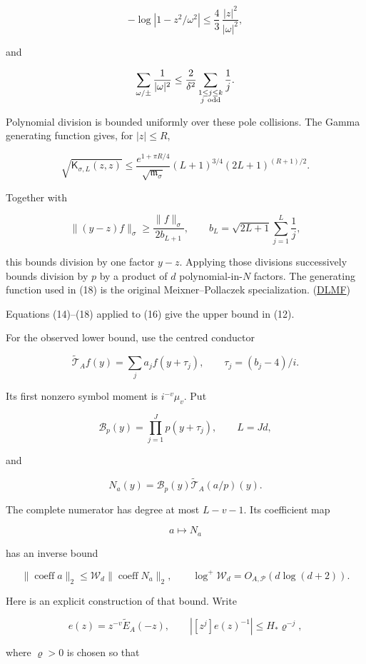 \documentclass[11pt]{article}
\begin{document}
\[
-\log|1-z^2/\omega^2|
\le\frac43\,\frac{|z|^2}{|\omega|^2},
\]

and

\[
\sum_{\omega/\pm}\frac1{|\omega|^2}
\le\frac2{\delta^2}
\sum_{\substack{1\le j\le k\\j\ {\rm odd}}}\frac1j.
\]

Polynomial division is bounded uniformly over these pole collisions. The Gamma generating function gives, for \(|z|\le R\),

\[
\sqrt{\mathsf K_{\sigma,L}(z,z)}
\le
\frac{e^{1+\pi R/4}}{\sqrt{\mathfrak m_\sigma}}
(L+1)^{3/4}(2L+1)^{(R+1)/2}.
\tag{18}
\]

Together with

\[
\|(y-z)f\|_\sigma
\ge\frac{\|f\|_\sigma}{2b_{L+1}},
\qquad
b_L=\sqrt{2L+1}\sum_{j=1}^{L}\frac1j,
\]

this bounds division by one factor \(y-z\). Applying those divisions successively bounds division by \(p\) by a product of \(d\) polynomial-in-\(N\) factors. The generating function used in (18) is the original Meixner--Pollaczek specialization. (\href{https://dlmf.nist.gov/18.23}{DLMF})

Equations (14)--(18) applied to (16) give the upper bound in (12).

For the observed lower bound, use the centred conductor

\[
\widetilde{\mathcal T}_Af(y)=\sum_j a_jf(y+\tau_j),
\qquad
\tau_j=(b_j-4)/i.
\]

Its first nonzero symbol moment is \(i^{-v}\mu_v\). Put

\[
\mathcal B_p(y)=\prod_{j=1}^{J}p(y+\tau_j),
\qquad L=Jd,
\]

and

\[
N_a(y)
=\mathcal B_p(y)\widetilde{\mathcal T}_A(a/p)(y).
\]

The complete numerator has degree at most \(L-v-1\). Its coefficient map

\[
a\longmapsto N_a
\]

has an inverse bound

\[
\|\operatorname{coeff}a\|_2
\le\mathcal W_d\|\operatorname{coeff}N_a\|_2,
\qquad
\log^+\mathcal W_d=O_{A,\mathscr P}(d\log(d+2)).
\tag{19}
\]

Here is an explicit construction of that bound. Write

\[
e(z)=z^{-v}\widetilde E_A(-z),\qquad
|[z^j]e(z)^{-1}|\le H_*\varrho^{-j},
\]

where \(\varrho>0\) is chosen so that
\end{document}
